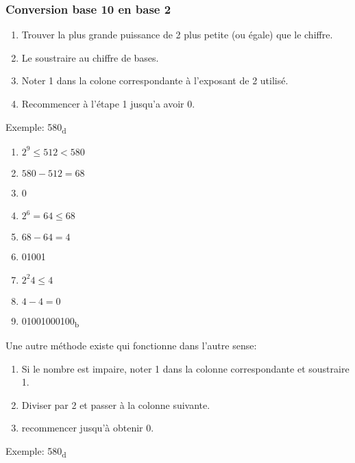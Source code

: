 \documentclass[10pt,a4paper]{article}
\begin{document}
 \subsubsection{Conversion base 10 en base 2}
 \begin{enumerate}
	 \item Trouver la plus grande puissance de 2 plus petite (ou égale) que le chiffre.
	 \item Le soustraire au chiffre de bases.
	 \item Noter 1 dans la colone correspondante à l'exposant de 2 utilisé.
	 \item Recommencer à l'étape 1 jusqu'a avoir 0.
 \end{enumerate}
 Exemple: 580\textsubscript{d}
 \begin{enumerate}
	 \item $2^9 \leq 512 < 580$
	 \item $580 - 512 = 68$
	 \item 0
	 \item $2^6 = 64 \leq 68$
	 \item $68 - 64 = 4$
	 \item 01001
	 \item $2^2 4 \leq 4$
	 \item $4 - 4 = 0$
	 \item 01001000100\textsubscript{b}
 \end{enumerate}
 Une autre méthode existe qui fonctionne dans l'autre sense:
 \begin{enumerate}
	 \item Si le nombre est impaire, noter 1 dans la colonne correspondante et soustraire 1.
	 \item Diviser par 2 et passer à la colonne suivante.
	 \item recommencer jusqu'à obtenir 0.
 \end{enumerate}
 Exemple: 580\textsubscript{d}
\end{document}
